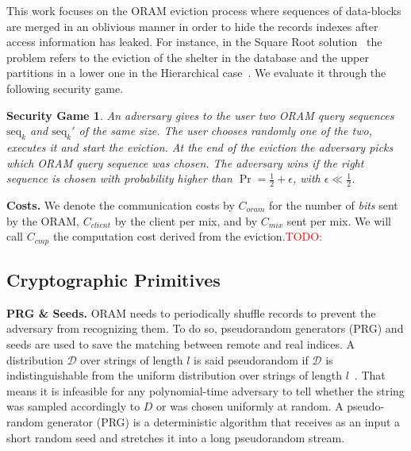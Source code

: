 \documentclass{llncs}
\newtheorem{privdef}{Privacy Definition}
\newtheorem*{secgme}{Security Game}
\newcommand{\todo}[1]{\textcolor{red}{TODO: #1}}
\begin{document}
This work focuses on the ORAM eviction process where sequences of data-blocks are merged in an oblivious manner in order to hide the records indexes after access information has leaked. For instance, in the Square Root solution~\cite{ostrovsky1990efficient} the problem refers to the eviction of the shelter in the database and the upper partitions in a lower one in the Hierarchical case~\cite{goldreich1996software}. We  evaluate it through the following security game.
%
\iffalse
\begin{privdef}
An ORAM eviction process is considered oblivious if an adversary cannot distinguish after eviction whether a specific record has been accessed.\\
That is to say, for the eviction of $s$ elements in an array of $n$ elements, and with $\epsilon =\mathcal{O}\left ( \frac{1}{n} \right )$, we have, $$ \forall i \in \llbracket 1, n \rrbracket,\ |\Pr(index_i \text{ was not retrieved} ) - \Pr(index_i \text{ was retrieved} )| \leq \epsilon$$
\label{def:Oblivious}
\end{privdef}
\fi
%
\begin{secgme}
An adversary gives to the user two ORAM query sequences $\text{seq}_k$ and $\text{seq}_k'$ of the same size. The user chooses randomly one of the two, executes it and start the eviction. At the end of the eviction the adversary picks which ORAM query sequence was chosen. The adversary wins if the right sequence is chosen with probability higher than $\Pr = \frac{1}{2}+\epsilon$, with $\epsilon\ll\frac{1}{2}$.
\label{def:Game}
\end{secgme} 
%
\iffalse
\begin{privdef}{Eviction Old Security.}
An ORAM eviction process is considered secure if an adversary cannot distinguish after eviction the location of any specific record. 
\end{privdef}
\fi
%
\noindent\textbf{Costs.} We denote the communication costs by $C_{oram}$ for the number of \emph{bits} sent by the ORAM, $C_{client}$ by the client per mix, and by $C_{mix}$ sent per mix. 
We will call $C_{cmp}$ the computation cost derived from the eviction.\todo{}
%
\subsection{Cryptographic Primitives}
\noindent\textbf{PRG \& Seeds.}
ORAM needs to periodically shuffle records to prevent the adversary from recognizing them. To do so, pseudorandom generators (PRG) and seeds are used to save the matching between remote and real indices. A distribution $\mathcal{D}$ over strings of length $l$ is said pseudorandom if $\mathcal{D}$ is indistinguishable from the uniform distribution over strings of length $l$~\cite{katz2014introduction}. That means it is infeasible for any polynomial-time adversary to tell whether the string was sampled accordingly to $D$ or was chosen uniformly at random. A pseudo-random generator (PRG) is a deterministic algorithm that receives as an input a short random seed and stretches it into a long pseudorandom stream.\\\
\end{document}
